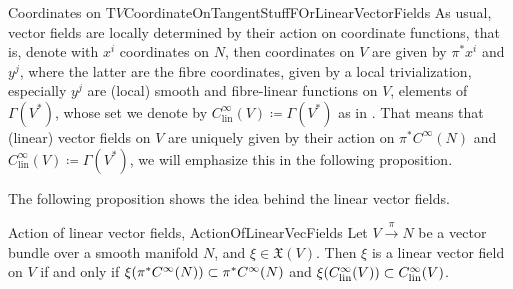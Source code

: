 \begin{remarks}{Coordinates on $\mathrm{T}V$}{CoordinateOnTangentStuffFOrLinearVectorFields}
As usual, vector fields are locally determined by their action on coordinate functions, that is, denote with $x^i$ coordinates on $N$, then coordinates on $V$ are given by $\pi^*x^i$ and $y^j$, where the latter are the fibre coordinates, given by a local trivialization, especially $y^j$ are (local) smooth and fibre-linear functions on $V$, elements of $\Gamma(V^*)$, whose set we denote by $C^\infty_{\mathrm{lin}}(V) \coloneqq \Gamma(V^*)$ as in \cite{mackenzieGeneralTheory}. That means that (linear) vector fields on $V$ are uniquely given by their action on $\pi^*C^\infty(N)$ and $C^\infty_{\mathrm{lin}}(V) \coloneqq \Gamma(V^*)$, we will emphasize this in the following proposition.
%
\end{remarks}

The following proposition shows the idea behind the linear vector fields.

\begin{propositions}{Action of linear vector fields, \newline \cite[first two statements of Proposition 3.4.2; page 113f.]{mackenzieGeneralTheory}}{ActionOfLinearVecFields}
Let $V \stackrel{\pi}{\to} N$ be a vector bundle over a smooth manifold $N$, and $\xi \in \mathfrak{X}(V)$. Then $\xi$ is a linear vector field on $V$ if and only if $\xi\mleft( \pi^*C^\infty(N) \mright) \subset \pi^*C^\infty(N)$ and $\xi \mleft( C^\infty_{\mathrm{lin}}(V) \mright) \subset C^\infty_{\mathrm{lin}}(V)$.
\end{propositions}

